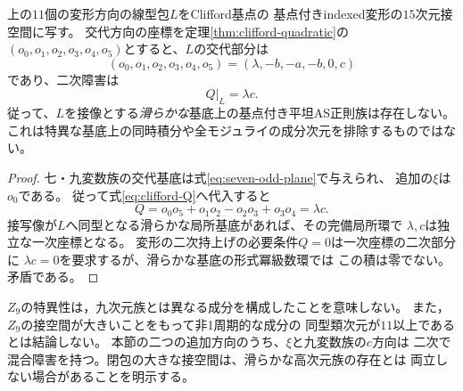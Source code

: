 \begin{proposition}[11接方向の同時積分を妨げる二次障害]
\label{prop:nine-closure-obstruction}
上の$11$個の変形方向の線型包$L$をClifford基点の
基点付きindexed変形の$15$次元接空間に写す。
交代方向の座標を定理\ref{thm:clifford-quadratic}の
$(o_0,o_1,o_2,o_3,o_4,o_5)$とすると、$L$の交代部分は
\[
 (o_0,o_1,o_2,o_3,o_4,o_5)=(\lambda,-b,-a,-b,0,c)
\]
であり、二次障害は
\[
 \left.Q\right|_L=\lambda c.
\]
従って、$L$を接像とする\emph{滑らかな}基底上の基点付き平坦AS正則族は存在しない。
これは特異な基底上の同時積分や全モジュライの成分次元を排除するものではない。
\end{proposition}
\begin{proof}
七・九変数族の交代基底は式\eqref{eq:seven-odd-plane}で与えられ、
追加の$\xi$は$o_0$である。
従って式\eqref{eq:clifford-Q}へ代入すると
\[
 Q=o_0o_5+o_1o_2-o_2o_3+o_3o_4=\lambda c.
\]
接写像が$L$へ同型となる滑らかな局所基底があれば、その完備局所環で
$\lambda,c$は独立な一次座標となる。
変形の二次持上げの必要条件$Q=0$は一次座標の二次部分に
$\lambda c=0$を要求するが、滑らかな基底の形式冪級数環では
この積は零でない。矛盾である。
\end{proof}

\begin{remark}
$Z_9$の特異性は，九次元族とは異なる成分を構成したことを意味しない。
また，$Z_9$の接空間が大きいことをもって非1周期的な成分の
同型類次元が$11$以上であるとは結論しない。
本節の二つの追加方向のうち、$\xi$と九変数族の$c$方向は
二次で混合障害を持つ。閉包の大きな接空間は、滑らかな高次元族の存在とは
両立しない場合があることを明示する。
\end{remark}
